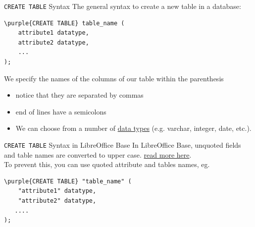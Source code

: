 \documentclass[xcolor=svgnames]{beamer}
\newcommand{\nl}{\\[1em]}
\newcommand{\purple}[1]{{\textcolor{DarkMagenta}{#1}}}
\newcounter{exercise} \setcounter{exercise}{0}
\theoremstyle{example}
\begin{document}
\begin{frame}[fragile]{{\tt CREATE TABLE} Syntax}
The general syntax to create a new table in a database:
\begin{Verbatim}[frame=single, xleftmargin=2cm, xrightmargin=2cm, commandchars=\\\{\}]
\purple{CREATE TABLE} table_name (
    attribute1 datatype,
    attribute2 datatype,
    ...
);
\end{Verbatim}
We specify the names of the columns of our table within the parenthesis
\begin{itemize}
\item notice that they are separated by commas 
\item end of lines have a semicolons 
\item We can choose from a number of \href{https://www.w3schools.com/sql/sql_datatypes.asp}{data types} (e.g. varchar, integer, date, etc.).\nl
\end{itemize}
\end{frame}

\begin{frame}[fragile]{{\tt CREATE TABLE} Syntax in LibreOffice Base}
In LibreOffice Base, unquoted fields and table names are converted to upper case. \href{https://eeperry.wordpress.com/2013/11/15/libreoffice-base-sql-creating-tables/}{read more here}.\\
\medskip
To prevent this, you can use quoted attribute and tables names, eg.
\begin{Verbatim}[frame=single, xleftmargin=2cm, xrightmargin=2cm, commandchars=\\\{\}]
\purple{CREATE TABLE} "table_name" (
    "attribute1" datatype,
    "attribute2" datatype,
   ....
);
\end{Verbatim}


\end{frame}


%
\end{document}

